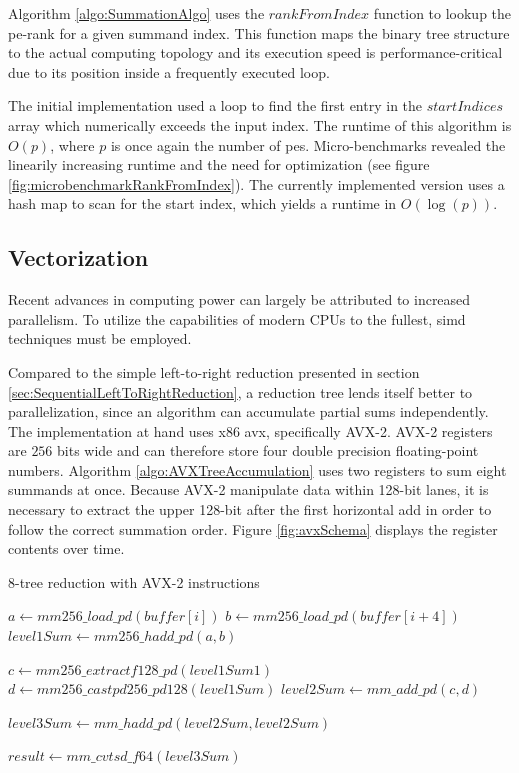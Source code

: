 Algorithm \ref{algo:SummationAlgo} uses the $rankFromIndex$ function to lookup the \gls{pe}-rank for a given summand index. This function
maps the binary tree structure to the actual computing topology and its
execution speed is performance-critical due to its position inside a frequently executed loop.

The initial implementation used a loop to find the first entry
in the $startIndices$ array which numerically exceeds the input index.
The runtime of this algorithm is $O(p)$, where $p$ is once again the number
of \glspl{pe}.
Micro-benchmarks revealed the linearily increasing runtime and the need for optimization (see figure \ref{fig:microbenchmarkRankFromIndex}).
The currently
implemented version uses a hash map to scan for the start index, which yields a runtime in $O(\log(p))$.

\subsection{Vectorization}
\label{sec:Vectorization}

Recent advances in computing power can largely be attributed to increased parallelism.
To utilize the capabilities of modern CPUs to the fullest, \gls{simd} techniques must be employed.

Compared to the simple left-to-right reduction presented in section
\ref{sec:SequentialLeftToRightReduction}, a reduction tree lends itself better to parallelization, since an algorithm can accumulate partial sums independently. The implementation at hand uses x86 \gls{avx}, specifically AVX-2.
AVX-2 registers are $256$ bits wide and can therefore store four double precision floating-point numbers. Algorithm \ref{algo:AVXTreeAccumulation} uses two registers to sum eight summands at once.
Because AVX-2 manipulate data within 128-bit lanes, it is necessary to extract the upper 128-bit after the first horizontal add in order to follow the correct summation order.
Figure \ref{fig:avxSchema} displays the register contents over time.


\begin{algorithm}
\caption{8-tree reduction with AVX-2 instructions}
\label{algo:AVXTreeAccumulation}
\DontPrintSemicolon
\SetAlgoLined

$a \gets mm256\_load\_pd(buffer[i])$\;
$b \gets mm256\_load\_pd(buffer[i + 4])$\;
$level1Sum \gets mm256\_hadd\_pd(a,b)$\;

$c \gets mm256\_extractf128\_pd(level1Sum 1)$\;
$d \gets mm256\_castpd256\_pd128(level1Sum)$\;
$level2Sum \gets mm\_add\_pd(c, d)$\;

$level3Sum \gets mm\_hadd\_pd(level2Sum, level2Sum)$\;

$result \gets mm\_cvtsd\_f64(level3Sum)$\;
\end{algorithm}

